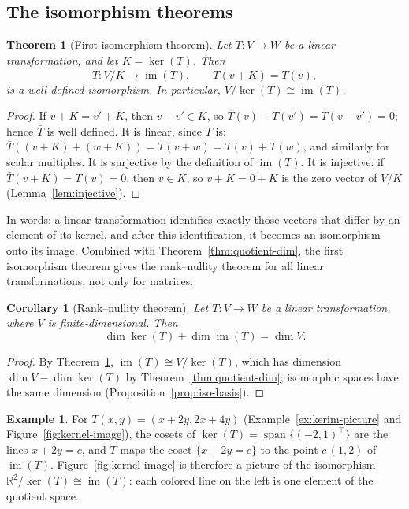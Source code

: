 \documentclass[11pt]{article}
\theoremstyle{definition}
\newtheorem{example}[definition]{Example}
\theoremstyle{plain}
\newtheorem{theorem}[definition]{Theorem}
\newtheorem{corollary}[definition]{Corollary}
\theoremstyle{remark}
\DeclareMathOperator{\im}{im}
\DeclareMathOperator{\Span}{span}
\begin{document}
\subsection{The isomorphism theorems}

\begin{theorem}[First isomorphism theorem]\label{thm:first-iso}
    Let $T: V \to W$ be a linear transformation, and let $K = \ker(T)$. Then
    \[\bar{T}: V/K \to \im(T), \qquad \bar{T}(v + K) = T(v),\]
    is a well-defined isomorphism. In particular, $V/\ker(T) \cong \im(T)$.
\end{theorem}

\begin{proof}
    If $v + K = v' + K$, then $v - v' \in K$, so $T(v) - T(v') = T(v - v') = 0$; hence $\bar{T}$ is well defined. It is linear, since $T$ is: $\bar{T}((v + K) + (w + K)) = T(v + w) = T(v) + T(w)$, and similarly for scalar multiples. It is surjective by the definition of $\im(T)$. It is injective: if $\bar{T}(v + K) = T(v) = 0$, then $v \in K$, so $v + K = 0 + K$ is the zero vector of $V/K$ (Lemma~\ref{lem:injective}).
\end{proof}

In words: a linear transformation identifies exactly those vectors that differ by an element of its kernel, and after this identification, it becomes an isomorphism onto its image. Combined with Theorem~\ref{thm:quotient-dim}, the first isomorphism theorem gives the rank--nullity theorem for all linear transformations, not only for matrices.

\begin{corollary}[Rank--nullity theorem]\label{cor:rank-nullity-general}
    Let $T: V \to W$ be a linear transformation, where $V$ is finite-dimensional. Then
    \[\dim \ker(T) + \dim \im(T) = \dim V.\]
\end{corollary}

\begin{proof}
    By Theorem~\ref{thm:first-iso}, $\im(T) \cong V/\ker(T)$, which has dimension $\dim V - \dim \ker(T)$ by Theorem~\ref{thm:quotient-dim}; isomorphic spaces have the same dimension (Proposition~\ref{prop:iso-basis}).
\end{proof}

\begin{example}
    For $T(x, y) = (x + 2y, 2x + 4y)$ (Example~\ref{ex:kerim-picture} and Figure~\ref{fig:kernel-image}), the cosets of $\ker(T) = \Span\{(-2, 1)^\top\}$ are the lines $x + 2y = c$, and $\bar{T}$ maps the coset $\{x + 2y = c\}$ to the point $c\,(1, 2)$ of $\im(T)$. Figure~\ref{fig:kernel-image} is therefore a picture of the isomorphism $\mathbb{R}^2/\ker(T) \cong \im(T)$: each colored line on the left is one element of the quotient space.
\end{example}
\end{document}
